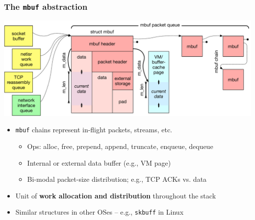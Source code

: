 \begin{frame}
  \frametitle{The \texttt{mbuf} abstraction}

  \begin{center}
    \includegraphics[width=\textwidth]{../../figures/network-mbufs.pdf}
  \end{center}

  \vspace{-0.45cm}
  \pause

  \begin{itemize}
    \item \texttt{mbuf} chains represent in-flight packets, streams, etc.

    \pause

    \begin{itemize}
      \item Ops: alloc, free, prepend, append, truncate, enqueue, dequeue
      \item Internal or external data buffer (e.g., VM page)
      \item Bi-modal packet-size distribution; e.g., TCP ACKs vs. data
    \end{itemize}

    \smallskip
    \pause

    \item Unit of \textbf{work allocation and distribution} throughout the
      stack
    \pause
    \item Similar structures in other OSes -- e.g., \texttt{skbuff} in Linux
  \end{itemize}
\end{frame}

